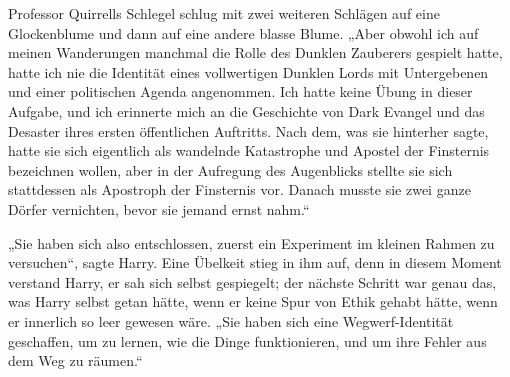 Professor Quirrells Schlegel schlug mit zwei weiteren Schlägen auf eine Glockenblume und dann auf eine andere blasse Blume.
„Aber obwohl ich auf meinen Wanderungen manchmal die Rolle des Dunklen Zauberers gespielt hatte, hatte ich nie die Identität eines vollwertigen Dunklen Lords mit Untergebenen und einer politischen Agenda angenommen. Ich hatte keine Übung in dieser Aufgabe, und ich erinnerte mich an die Geschichte von Dark Evangel und das Desaster ihres ersten öffentlichen Auftritts. Nach dem, was sie hinterher sagte, hatte sie sich eigentlich als wandelnde Katastrophe und Apostel der Finsternis bezeichnen wollen, aber in der Aufregung des Augenblicks stellte sie sich stattdessen als Apostroph der Finsternis vor. Danach musste sie zwei ganze Dörfer vernichten, bevor sie jemand ernst nahm.“

„Sie haben sich also entschlossen, zuerst ein Experiment im kleinen Rahmen zu versuchen“, sagte Harry.
Eine Übelkeit stieg in ihm auf, denn in diesem Moment verstand Harry, er sah sich selbst gespiegelt; der nächste Schritt war genau das, was Harry selbst getan hätte, wenn er keine Spur von Ethik gehabt hätte, wenn er innerlich so leer gewesen wäre.
„Sie haben sich eine Wegwerf-Identität geschaffen, um zu lernen, wie die Dinge funktionieren, und um ihre Fehler aus dem Weg zu räumen.“


